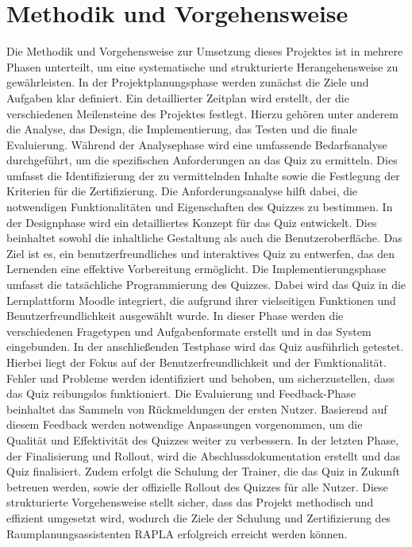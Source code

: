 \section{Methodik und Vorgehensweise}
Die Methodik und Vorgehensweise zur Umsetzung dieses Projektes ist in mehrere Phasen unterteilt, um eine systematische und strukturierte Herangehensweise zu gewährleisten.
In der Projektplanungsphase werden zunächst die Ziele und Aufgaben klar definiert. Ein detaillierter Zeitplan wird erstellt, der die verschiedenen Meilensteine des Projektes festlegt. Hierzu gehören unter anderem die Analyse, das Design, die Implementierung, das Testen und die finale Evaluierung.
Während der Analysephase wird eine umfassende Bedarfsanalyse durchgeführt, um die spezifischen Anforderungen an das Quiz zu ermitteln. Dies umfasst die Identifizierung der zu vermittelnden Inhalte sowie die Festlegung der Kriterien für die Zertifizierung. Die Anforderungsanalyse hilft dabei, die notwendigen Funktionalitäten und Eigenschaften des Quizzes zu bestimmen.
In der Designphase wird ein detailliertes Konzept für das Quiz entwickelt. Dies beinhaltet sowohl die inhaltliche Gestaltung als auch die Benutzeroberfläche. Das Ziel ist es, ein benutzerfreundliches und interaktives Quiz zu entwerfen, das den Lernenden eine effektive Vorbereitung ermöglicht.
Die Implementierungsphase umfasst die tatsächliche Programmierung des Quizzes. Dabei wird das Quiz in die Lernplattform Moodle integriert, die aufgrund ihrer vielseitigen Funktionen und Benutzerfreundlichkeit ausgewählt wurde. In dieser Phase werden die verschiedenen Fragetypen und Aufgabenformate erstellt und in das System eingebunden.
In der anschließenden Testphase wird das Quiz ausführlich getestet. Hierbei liegt der Fokus auf der Benutzerfreundlichkeit und der Funktionalität. Fehler und Probleme werden identifiziert und behoben, um sicherzustellen, dass das Quiz reibungslos funktioniert.
Die Evaluierung und Feedback-Phase beinhaltet das Sammeln von Rückmeldungen der ersten Nutzer. Basierend auf diesem Feedback werden notwendige Anpassungen vorgenommen, um die Qualität und Effektivität des Quizzes weiter zu verbessern.
In der letzten Phase, der Finalisierung und Rollout, wird die Abschlussdokumentation erstellt und das Quiz finalisiert. Zudem erfolgt die Schulung der Trainer, die das Quiz in Zukunft betreuen werden, sowie der offizielle Rollout des Quizzes für alle Nutzer.
Diese strukturierte Vorgehensweise stellt sicher, dass das Projekt methodisch und effizient umgesetzt wird, wodurch die Ziele der Schulung und Zertifizierung des Raumplanungsassistenten RAPLA erfolgreich erreicht werden können.


